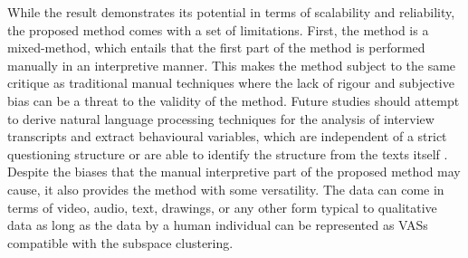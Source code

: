 


While the result demonstrates its potential in terms of scalability and reliability, the proposed method comes with a set of limitations. First, the method is a mixed-method, which entails that the first part of the method is performed manually in an interpretive manner. This makes the method subject to the same critique as traditional manual techniques where the lack of rigour and subjective bias can be a threat to the validity of the method. Future studies should attempt to derive natural language processing techniques for the analysis of interview transcripts and extract behavioural variables, which are independent of a strict questioning structure or are able to identify the structure from the texts itself \citep{Young2018}. Despite the biases that the manual interpretive part of the proposed method may cause, it also provides the method with some versatility. The data can come in terms of video, audio, text, drawings, or any other form typical to qualitative data \citep{Bjrner2018} as long as the data by a human individual can be represented as VASs compatible with the subspace clustering.

